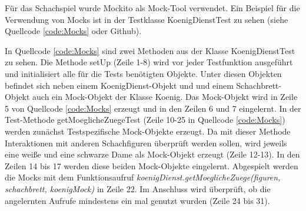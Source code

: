 Für das Schachspiel wurde Mockito als Mock-Tool verwendet. Ein Beispiel für die Verwendung von Mocks ist in der Testklasse KoenigDienstTest zu sehen (siehe Quellcode \ref{code:Mocks} oder Github). 



In Quellcode \ref{code:Mocks} sind zwei Methoden aus der Klasse KoenigDienstTest zu sehen. Die Methode setUp (Zeile 1-8) wird vor jeder Testfunktion ausgeführt und initialisiert alle für die Tests benötigten Objekte. Unter diesen Objekten befindet sich neben einem KoenigDienst-Objekt und und einem Schachbrett-Objekt auch ein Mock-Objekt der Klasse Koenig. Das Mock-Objekt wird in Zeile 5 von Quellcode \ref{code:Mocks} erzeugt und in den Zeilen 6 und 7 eingelernt. In der Test-Methode getMoeglicheZuegeTest (Zeile 10-25 in Quellcode \ref{code:Mocks}) werden zunächst Testspezifische Mock-Objekte erzeugt. Da mit dieser Methode Interaktionen mit anderen Schachfiguren überprüft werden sollen, wird jeweils eine weiße und eine schwarze Dame als Mock-Objekt erzeugt (Zeile 12-13). In den Zeilen 14 bis 17 werden diese beiden Mock-Objekte eingelernt. Abgespielt werden die Mocks mit dem Funktionsaufruf \emph{koenigDienst.getMoeglicheZuege(figuren, schachbrett, koenigMock)} in Zeile 22. Im Anschluss wird überprüft, ob die angelernten Aufrufe mindestens ein mal genutzt wurden (Zeile 24 bis 31).